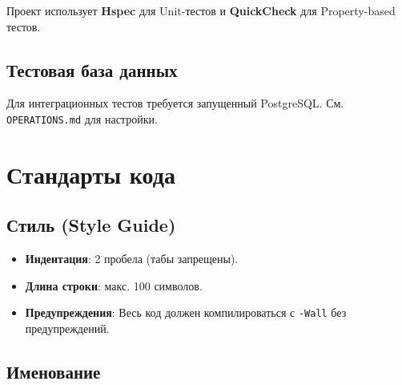 Проект использует \textbf{Hspec} для Unit-тестов и \textbf{QuickCheck}
для Property-based тестов.

\begin{Shaded}
\begin{Highlighting}[]

 

\end{Highlighting}
\end{Shaded}

\subsection{Тестовая база
данных}\label{ux442ux435ux441ux442ux43eux432ux430ux44f-ux431ux430ux437ux430-ux434ux430ux43dux43dux44bux445}

Для интеграционных тестов требуется запущенный PostgreSQL. См.
\texttt{OPERATIONS.md} для настройки.

\section{Стандарты
кода}\label{ux441ux442ux430ux43dux434ux430ux440ux442ux44b-ux43aux43eux434ux430}

\subsection{Стиль (Style
Guide)}\label{ux441ux442ux438ux43bux44c-style-guide}

\begin{itemize}
\tightlist
\item
  \textbf{Индентация}: 2 пробела (табы запрещены).
\item
  \textbf{Длина строки}: макс. 100 символов.
\item
  \textbf{Предупреждения}: Весь код должен компилироваться с
  \texttt{-Wall} без предупреждений.
\end{itemize}

\subsection{Именование}\label{ux438ux43cux435ux43dux43eux432ux430ux43dux438ux435}


